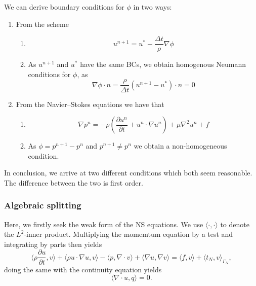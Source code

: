 We can derive boundary conditions for $\phi$ in two ways:
\begin{enumerate}
    \item From the scheme
        \begin{enumerate}
            \item \[
                    u^{n + 1} = u^* - \frac{\Delta t}{\rho} \nabla \phi
                \]

            \item As $u^{n+1}$ and $u^*$ have the same BCs, we obtain homogenous Neumann conditions for $\phi$, as
                \begin{equation}
                    \nabla \phi \cdot n = \frac{\rho}{\Delta t} (u^{n + 1} - u^*) \cdot n = 0
                \end{equation}
        \end{enumerate}

    \item From the Navier--Stokes equations we have that %
        \begin{enumerate}
            \item \[
                    \nabla p^n = - \rho\left(
                        \frac{\partial u^n}{\partial t} + u^n \cdot \nabla u^n
                    \right) + \mu\nabla^2 u^n + f
                \]

            \item As $\phi = p^{n+1} - p^n$ and \( p^{n + 1} \neq p^n \) we obtain a non-homogeneous condition.
        \end{enumerate}
\end{enumerate}
In conclusion, we arrive at two different conditions which both seem reasonable.
The difference between the two is first order.

\subsubsection{Algebraic splitting}
Here, we firstly seek the weak form of the NS equations.
We use \( \langle \cdot, \cdot \rangle \) to denote the \(L^2\)-inner product.
Multiplying the momemtum equation by a test and integrating by parts then yields
\begin{equation}
    \langle \rho \frac{\partial u}{\partial t} , v \rangle
    + \langle \rho u \cdot \nabla u, v \rangle
    - \langle p, \nabla \cdot v \rangle
    + \langle \nabla u, \nabla v \rangle
    = \langle f, v \rangle + \langle t_N, v \rangle_{\Gamma_N},
\end{equation}
doing the same with the continuity equation yields
\begin{equation}
    \langle \nabla \cdot u, q \rangle = 0.
\end{equation}
